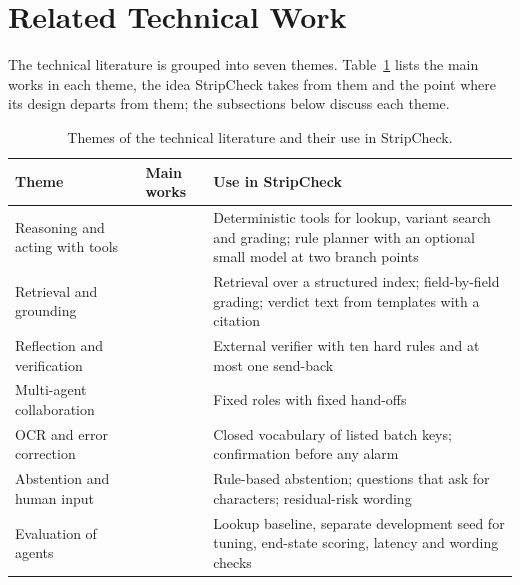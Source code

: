 \section{Related Technical Work}
\label{sec:lit-related-technical-work}

The technical literature is grouped into seven themes. Table~\ref{tab:lit-themes} lists the main works in each theme, the idea StripCheck takes from them and the point where its design departs from them; the subsections below discuss each theme.

\begin{table}[htbp]
\centering
\caption{Themes of the technical literature and their use in StripCheck.}
\label{tab:lit-themes}
\small
\renewcommand{\arraystretch}{1.15}
\begin{tabularx}{\linewidth}{@{}>{\raggedright\arraybackslash}p{2.7cm} >{\raggedright\arraybackslash}p{2.6cm} >{\raggedright\arraybackslash}X@{}}
\toprule
\textbf{Theme} & \textbf{Main works} & \textbf{Use in StripCheck} \\
\midrule
Reasoning and acting with tools & \cite{yao2023react,schick2023toolformer,karpas2022mrkl} & Deterministic tools for lookup, variant search and grading; rule planner with an optional small model at two branch points \\
Retrieval and grounding & \cite{gao2023alce,rashkin2023ais,fellegi1969theory,christen2012survey} & Retrieval over a structured index; field-by-field grading; verdict text from templates with a citation \\
Reflection and verification & \cite{shinn2023reflexion,huang2024cannot,kambhampati2024llmmodulo} & External verifier with ten hard rules and at most one send-back \\
Multi-agent collaboration & \cite{wu2023autogen,hong2023metagpt,wang2023survey} & Fixed roles with fixed hand-offs \\
OCR and error correction & \cite{du2020ppocr,kernighan1990spelling,kolak2003generative,laroca2021efficient} & Closed vocabulary of listed batch keys; confirmation before any alarm \\
Abstention and human input & \cite{chow1970reject,madras2018defer,bucinca2021trust,batteux2022residual} & Rule-based abstention; questions that ask for characters; residual-risk wording \\
Evaluation of agents & \cite{yao2024taubench,kapoor2024agents,zhu2025agentic} & Lookup baseline, separate development seed for tuning, end-state scoring, latency and wording checks \\
\bottomrule
\end{tabularx}
\end{table}

